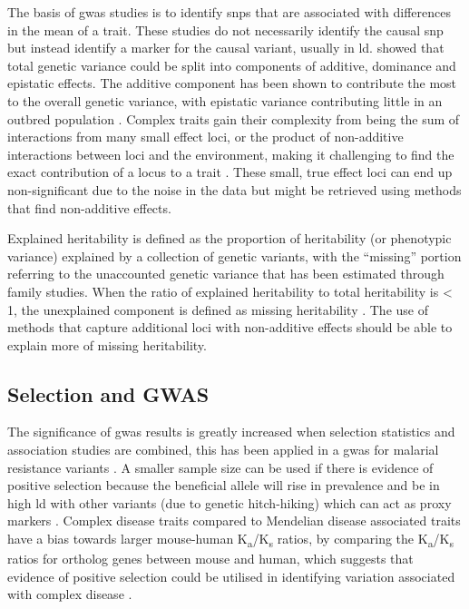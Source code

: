 \documentclass[]{report}
\begin{document}
The basis of \gls{gwas} studies is to identify \glspl{snp} that are
associated with differences in the mean of a trait. These studies do not
necessarily identify the causal \gls{snp} but instead identify a marker
for the causal variant, usually in \gls{ld}. \citet{Fisher1919} showed
that total genetic variance could be split into components of additive,
dominance and epistatic effects. The additive component has been shown
to contribute the most to the overall genetic variance, with epistatic
variance contributing little in an outbred population \citep{Hill2008}.
Complex traits gain their complexity from being the sum of interactions
from many small effect loci, or the product of non-additive interactions
between loci and the environment, making it challenging to find the
exact contribution of a locus to a trait \citep{Fu2013a}. These small,
true effect loci can end up non-significant due to the noise in the data
but might be retrieved using methods that find non-additive effects.

Explained heritability is defined as the proportion of heritability (or
phenotypic variance) explained by a collection of genetic variants, with
the ``missing'' portion referring to the unaccounted genetic variance
that has been estimated through family studies. When the ratio of
explained heritability to total heritability is \textless{} 1, the
unexplained component is defined as missing heritability
\citep{Zuk2012}. The use of methods that capture additional loci with
non-additive effects should be able to explain more of missing
heritability.

\subsection{Selection and GWAS}\label{selection-and-gwas}

The significance of \gls{gwas} results is greatly increased when
selection statistics and association studies are combined, this has been
applied in a \gls{gwas} for malarial resistance variants
\citep{Ayodo2007}. A smaller sample size can be used if there is
evidence of positive selection because the beneficial allele will rise
in prevalence and be in high \gls{ld} with other variants (due to
genetic hitch-hiking) which can act as proxy markers
\citep{Karlsson2014}. Complex disease traits compared to Mendelian
disease associated traits have a bias towards larger mouse-human
K\textsubscript{a}/K\textsubscript{s} ratios, by comparing the
K\textsubscript{a}/K\textsubscript{s} ratios for ortholog genes between
mouse and human, which suggests that evidence of positive selection
could be utilised in identifying variation associated with complex
disease \citep{Thomas2004}.
\end{document}
